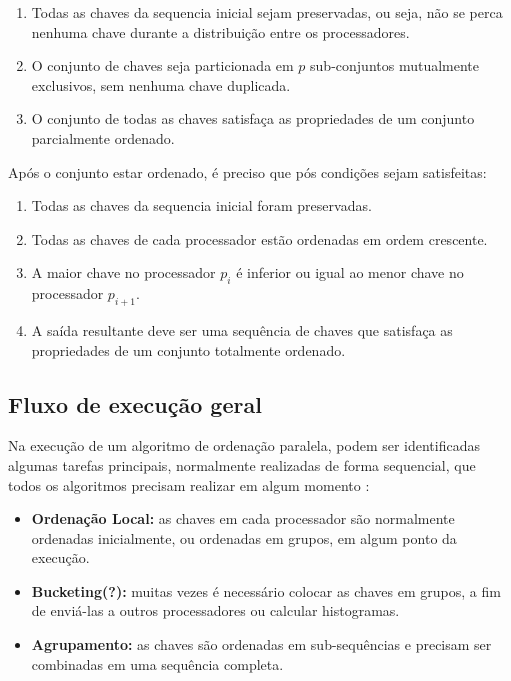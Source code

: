 \begin{enumerate}
\item Todas as chaves da sequencia inicial sejam preservadas, ou seja, não se perca nenhuma chave durante a distribuição entre os processadores.
\item  O conjunto de chaves seja particionada em $p$ sub-conjuntos mutualmente exclusivos, sem nenhuma chave duplicada.
\item O conjunto de todas as chaves satisfaça as propriedades de um conjunto parcialmente ordenado.
\end{enumerate}

Após o conjunto estar ordenado, é preciso que pós condições sejam satisfeitas:
\begin{enumerate}

\item Todas as chaves da sequencia inicial foram preservadas.
\item Todas as chaves de cada processador estão ordenadas em ordem crescente.
\item A maior chave no processador $p_{i}$ é inferior ou igual ao menor chave no processador $p_{i+1}$.
\item A saída resultante deve ser uma sequência de chaves que satisfaça as propriedades de um conjunto totalmente ordenado.

\end{enumerate}

\subsection{Fluxo de execução geral}

Na execução de um algoritmo de ordenação paralela, podem ser identificadas algumas tarefas principais,  normalmente realizadas de forma sequencial, que todos os algoritmos precisam realizar em algum momento \cite{Kale:2010}: 


\begin{itemize}
\item \textbf{Ordenação Local:} as chaves em cada processador são normalmente ordenadas inicialmente, ou ordenadas em grupos, em algum ponto da execução.
\item \textbf{Bucketing(?):} muitas vezes é necessário colocar as chaves em grupos, a fim de enviá-las a outros processadores ou calcular histogramas.
\item \textbf{Agrupamento:} as chaves são ordenadas em sub-sequências e precisam ser combinadas em uma sequência completa.
\end{itemize}



